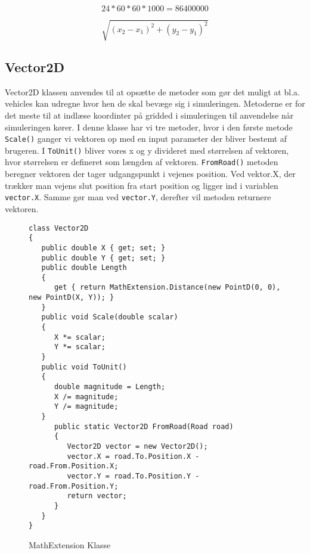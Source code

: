 \begin{equation} \label{ConvertKthToMms}
24 * 60 * 60 * 1000 = 86400000
\end{equation}

\begin{equation} \label{AfstandsFormel}
\sqrt{(x_2 - x_1)^2 + (y_2 - y_1)^2}
\end{equation}

\subsection{Vector2D}
Vector2D klassen anvendes til at opsætte de metoder som gør det muligt at bl.a. vehicles kan udregne hvor hen de skal bevæge sig i simuleringen. Metoderne er for det meste til at indlæse koordinter på gridded i simuleringen til anvendelse når simuleringen kører. I denne klasse har vi tre metoder, hvor i den første metode \texttt{Scale()} ganger vi vektoren op med en input parameter der bliver bestemt af brugeren. I \texttt{ToUnit()} bliver vores x og y divideret med størrelsen af vektoren, hvor størrelsen er defineret som længden af vektoren. \texttt{FromRoad()} metoden beregner vektoren der tager udgangspunkt i vejenes position. Ved vektor.X, der trækker man vejens slut position fra start position og ligger ind i variablen \texttt{vector.X}. Samme gør man ved \texttt{vector.Y}, derefter vil metoden returnere vektoren.

\begin{figure}[H]
\begin{lstlisting}
class Vector2D
{
   public double X { get; set; }
   public double Y { get; set; }
   public double Length
   {
      get { return MathExtension.Distance(new PointD(0, 0), new PointD(X, Y)); }
   }
   public void Scale(double scalar)
   {
      X *= scalar;
      Y *= scalar;
   }
   public void ToUnit()
   {
      double magnitude = Length;
      X /= magnitude;
      Y /= magnitude;
   }
      public static Vector2D FromRoad(Road road)
      {
         Vector2D vector = new Vector2D();
         vector.X = road.To.Position.X - road.From.Position.X;
         vector.Y = road.To.Position.Y - road.From.Position.Y;
         return vector;
      }
   }
}
\end{lstlisting}
\caption{MathExtension Klasse}\label{MathExtensionClass}
\end{figure}
